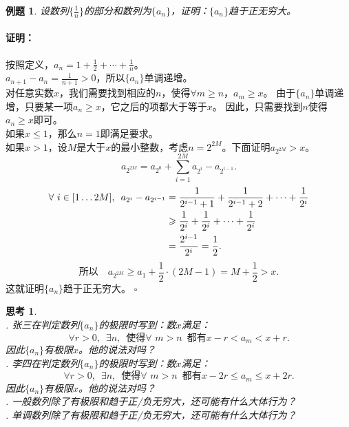 \documentclass[12pt,UTF8]{ctexbook}
\newtheorem{et}{例题}[section]
\newtheorem{sk}{思考}[section]
\newenvironment{proof2}{\paragraph{\textbf{证明：}}}{\hfill$\square$}
\begin{document}
\begin{et}
    设数列$\{\frac{1}{n}\}$的部分和数列为$\{a_n\}$，证明：$\{a_n\}$趋于正无穷大。
\end{et}
\begin{proof2}
    按照定义，$ a_n = 1 + \frac{1}{2} + \cdots + \frac{1}{n}$。\\
    $a_{n+1} - a_n = \frac{1}{n+1} > 0$，所以$\{a_n\}$单调递增。\\
    对任意实数$x$，我们需要找到相应的$n$，使得$\forall m \geqslant n$，$a_m \geqslant x$。
    由于$\{a_n\}$单调递增，只要某一项$a_n \geqslant x$，它之后的项都大于等于$x$。
    因此，只需要找到$n$使得$a_n \geqslant x$即可。\\
    如果$x \leqslant 1$，那么$n=1$即满足要求。\\
    如果$x > 1$，设$M$是大于$x$的最小整数，考虑$n = 2^{2M}$。下面证明$a_{2^{2M}}>x$。\\
    $$ a_{2^{2M}} = a_{2^0} + \sum_{i=1}^{2M}a_{2^i} - a_{2^{i-1}}.$$
    \begin{align}
        \forall \,\, i\in[1\ldots 2M],\,\,\, a_{2^i} - a_{2^{i-1}} &= \frac{1}{2^{i-1}+1} + \frac{1}{2^{i-1}+2} + \cdots + \frac{1}{2^{i}} \notag \\
        &\geqslant \frac{1}{2^{i}} + \frac{1}{2^{i}} + \cdots + \frac{1}{2^{i}} \notag \\
        &= \frac{2^{i-1}}{2^{i}} = \frac{1}{2}. \notag
    \end{align}
    $$ \mbox{所以}\quad  a_{2^{2M}} \geqslant a_1 + \frac{1}{2} \cdot (2M - 1) = M + \frac{1}{2} > x. $$
    这就证明$\{a_n\}$趋于正无穷大。
\end{proof2}

\begin{sk}
    \mbox{} \\
    . 张三在判定数列$\{a_n\}$的极限时写到：数$x$满足：
    $$ \forall r > 0, \,\,\, \exists n,  \,\,\, \mbox{使得} \forall \,\, m > n \,\,\, \mbox{都有} x - r < a_m < x + r. $$
    \indent 因此$\{a_n\}$有极限$x$。他的说法对吗？\\
    . 李四在判定数列$\{a_n\}$的极限时写到：数$x$满足：
    $$ \forall r > 0, \,\,\, \exists n,  \,\,\, \mbox{使得} \forall \,\, m > n \,\,\, \mbox{都有} x - 2r \leqslant a_m \leqslant x + 2r. $$
    \indent 因此$\{a_n\}$有极限$x$。他的说法对吗？\\
    . 一般数列除了有极限和趋于正/负无穷大，还可能有什么大体行为？\\
    . 单调数列除了有极限和趋于正/负无穷大，还可能有什么大体行为？
\end{sk}
\end{document}
